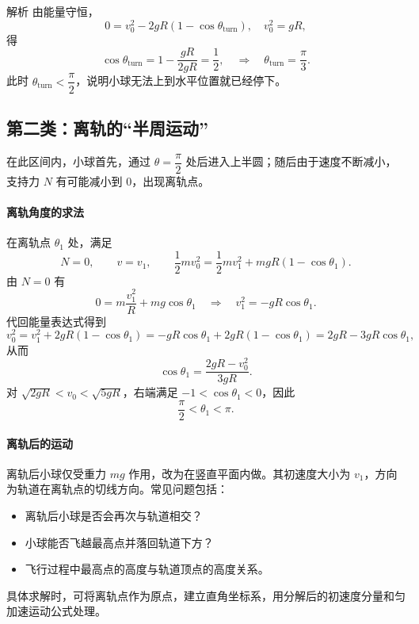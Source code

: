 \documentclass[a4paper,11pt]{ctexart}
\begin{document}
\begin{proofbox}{解析}
  由能量守恒，
  \[
    0 = v_0^2 - 2gR(1-\cos\theta_{\text{turn}}),
    \quad v_0^2 = gR,
  \]
  得
  \[
    \cos\theta_{\text{turn}} = 1 - \frac{gR}{2gR} = \frac{1}{2},
    \quad\Rightarrow\quad
    \theta_{\text{turn}} = \frac{\pi}{3}.
  \]
  此时 $\theta_{\text{turn}}<\dfrac{\pi}{2}$，说明小球无法上到水平位置就已经停下。
\end{proofbox}

\subsection{第二类：离轨的“半周运动”}


在此区间内，小球首先，通过 $\theta=\dfrac{\pi}{2}$ 处后进入上半圆；随后由于速度不断减小，支持力 $N$ 有可能减小到 $0$，出现离轨点。

\paragraph*{离轨角度的求法}
在离轨点 $\theta_1$ 处，满足
\[
  N=0,\qquad v=v_1,\qquad \frac12 m v_0^2 = \frac12 m v_1^2 + mgR(1-\cos\theta_1).
\]
由 $N=0$ 有
\[
  0 = m\frac{v_1^2}{R} + mg\cos\theta_1
  \quad\Rightarrow\quad
  v_1^2 = -gR\cos\theta_1.
\]
代回能量表达式得到
\[
  v_0^2 = v_1^2 + 2gR(1-\cos\theta_1)
         = -gR\cos\theta_1 + 2gR(1-\cos\theta_1)
         = 2gR - 3gR\cos\theta_1,
\]
从而
\begin{equation}
  \cos\theta_1 = \frac{2gR - v_0^2}{3gR}.
  \label{eq:theta1}
\end{equation}
对 $\sqrt{2gR} < v_0 < \sqrt{5gR}$，右端满足 $-1<\cos\theta_1<0$，因此
\[
  \frac{\pi}{2} < \theta_1 < \pi.
\]

\paragraph*{离轨后的运动}
离轨后小球仅受重力 $mg$ 作用，改为在竖直平面内做。其初速度大小为 $v_1$，方向为轨道在离轨点的切线方向。常见问题包括：
\begin{itemize}
  \item 离轨后小球是否会再次与轨道相交？
  \item 小球能否飞越最高点并落回轨道下方？
  \item 飞行过程中最高点的高度与轨道顶点的高度关系。
\end{itemize}
具体求解时，可将离轨点作为原点，建立直角坐标系，用分解后的初速度分量和匀加速运动公式处理。
\end{document}
